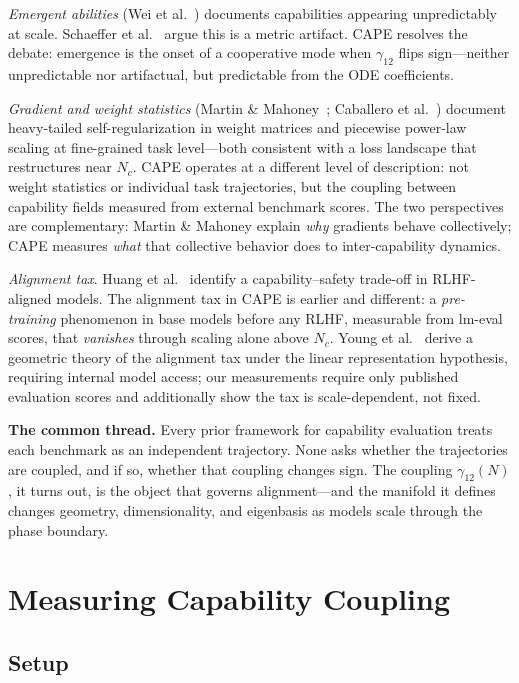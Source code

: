 \documentclass[11pt]{article}
\begin{document}
\textit{Emergent abilities} (Wei et al.~\cite{wei2022}) documents capabilities appearing unpredictably at scale.
Schaeffer et al.~\cite{schaeffer2024} argue this is a metric artifact.
CAPE resolves the debate: emergence is the onset of a cooperative mode when $\gamma_{12}$ flips sign---neither unpredictable nor artifactual, but predictable from the ODE coefficients.

\textit{Gradient and weight statistics} (Martin \& Mahoney~\cite{martin2021}; Caballero et al.~\cite{caballero2022}) document heavy-tailed self-regularization in weight matrices and piecewise power-law scaling at fine-grained task level---both consistent with a loss landscape that restructures near $N_c$.
CAPE operates at a different level of description: not weight statistics or individual task trajectories, but the coupling between capability fields measured from external benchmark scores.
The two perspectives are complementary: Martin \& Mahoney explain \emph{why} gradients behave collectively; CAPE measures \emph{what} that collective behavior does to inter-capability dynamics.

\textit{Alignment tax}.
Huang et al.~\cite{huang2025} identify a capability--safety trade-off in RLHF-aligned models.
The alignment tax in CAPE is earlier and different: a \emph{pre-training} phenomenon in base models before any RLHF, measurable from lm-eval scores, that \emph{vanishes} through scaling alone above $N_c$.
Young et al.~\cite{young2026} derive a geometric theory of the alignment tax under the linear representation hypothesis, requiring internal model access; our measurements require only published evaluation scores and additionally show the tax is scale-dependent, not fixed.

\textbf{The common thread.}
Every prior framework for capability evaluation treats each benchmark as an independent trajectory.
None asks whether the trajectories are coupled, and if so, whether that coupling changes sign.
The coupling $\gamma_{12}(N)$, it turns out, is the object that governs alignment---and the manifold it defines changes geometry, dimensionality, and eigenbasis as models scale through the phase boundary.

\section{Measuring Capability Coupling}
\label{sec:coupling}

\subsection{Setup}
\end{document}
